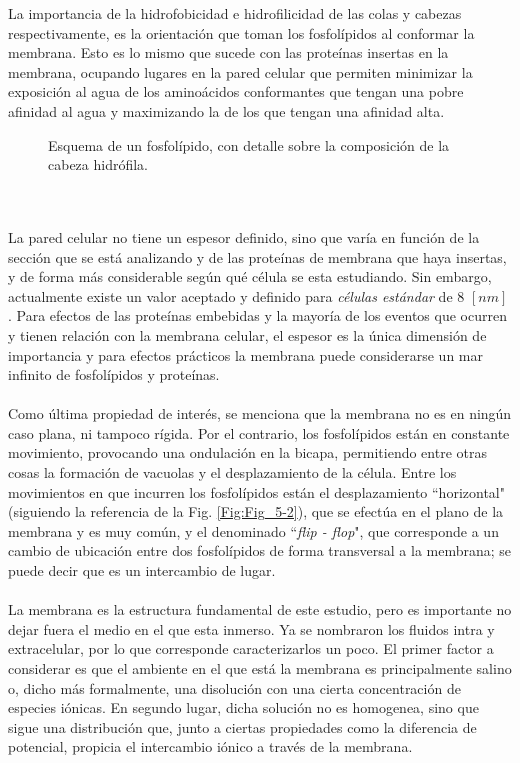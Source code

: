 \documentclass[12pt, oneside, numbers, spanish]{ezthesis}
\numberwithin{equation}{section}
\begin{document}
\noindent
La importancia de la hidrofobicidad e hidrofilicidad de las colas y cabezas respectivamente, es la orientación que toman los fosfolípidos al conformar la membrana. Esto es lo mismo que sucede con las proteínas insertas en la membrana, ocupando lugares en la pared celular que permiten minimizar la exposición al agua de los aminoácidos conformantes que tengan una pobre afinidad al agua y maximizando la de los que tengan una afinidad alta.
\begin{figure}[h]
	\centering
	
	\caption{Esquema de un fosfolípido, con detalle sobre la composición de la cabeza hidrófila.}\label{Fig:Fig_5}
\end{figure}
\\\\
La pared celular no tiene un espesor definido, sino que varía en función de la sección que se está analizando y de las proteínas de membrana que haya insertas, y de forma más considerable según qué célula se esta estudiando. Sin embargo, actualmente existe un valor aceptado y definido para \textit{células estándar} de 8 $[nm]$ \cite{Lombard}. Para efectos de las proteínas embebidas y la mayoría de los eventos que ocurren y tienen relación con la membrana celular, el espesor es la única dimensión de importancia y para efectos prácticos la membrana puede considerarse un mar infinito de fosfolípidos y proteínas.\\\\
Como última propiedad de interés, se menciona que la membrana no es en ningún caso plana, ni tampoco rígida. Por el contrario, los fosfolípidos están en constante movimiento, provocando una ondulación en la bicapa, permitiendo entre otras cosas la formación de vacuolas y el desplazamiento de la célula. Entre los movimientos en que incurren los fosfolípidos están el desplazamiento ``horizontal" (siguiendo la referencia de la Fig. \ref{Fig:Fig_5-2}), que se efectúa en el plano de la membrana y es muy común, y el denominado ``\textit{flip - flop}", que corresponde a un cambio de ubicación entre dos fosfolípidos de forma transversal a la membrana; se puede decir que es un intercambio de lugar.\\\\
La membrana es la estructura fundamental de este estudio, pero es importante no dejar fuera el medio en el que esta inmerso. Ya se nombraron los fluidos intra y extracelular, por lo que corresponde caracterizarlos un poco. El primer factor a considerar es que el ambiente en el que está la membrana es principalmente salino o, dicho más formalmente, una disolución con una cierta concentración de especies iónicas. En segundo lugar, dicha solución no es homogenea, sino que sigue una distribución que, junto a ciertas propiedades como la diferencia de potencial, propicia el intercambio iónico a través de la membrana.
\end{document}
